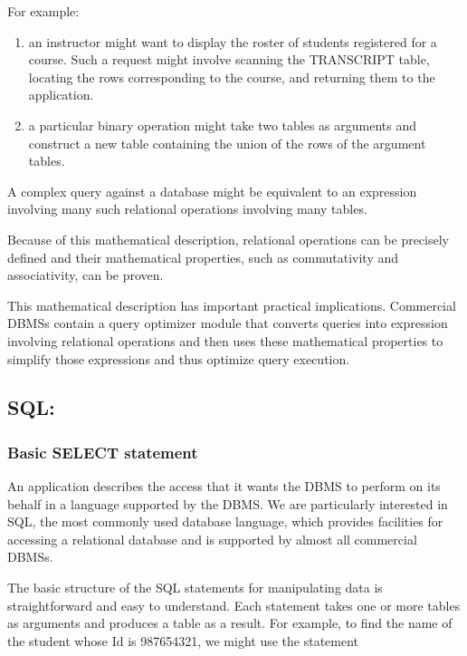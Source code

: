 \documentclass[]{article}
\providecommand{\tightlist}{%
  \setlength{\itemsep}{0pt}\setlength{\parskip}{0pt}}
\begin{document}
For example:

\begin{enumerate}
\def\labelenumi{\arabic{enumi}.}
\tightlist
\item
  an instructor might want to display the roster of students registered
  for a course. Such a request might involve scanning the TRANSCRIPT
  table, locating the rows corresponding to the course, and returning
  them to the application.\\
\item
  a particular binary operation might take two tables as arguments and
  construct a new table containing the union of the rows of the argument
  tables.
\end{enumerate}

A complex query against a database might be equivalent to an expression
involving many such relational operations involving many tables.

Because of this mathematical description, relational operations can be
precisely defined and their mathematical properties, such as
commutativity and associativity, can be proven.

This mathematical description has important practical implications.
Commercial DBMSs contain a query optimizer module that converts queries
into expression involving relational operations and then uses these
mathematical properties to simplify those expressions and thus optimize
query execution.

\hypertarget{sql}{%
\subsection{SQL:}\label{sql}}

\hypertarget{basic-select-statement}{%
\subsubsection{Basic SELECT statement}\label{basic-select-statement}}

An application describes the access that it wants the DBMS to perform on
its behalf in a language supported by the DBMS. We are particularly
interested in SQL, the most commonly used database language, which
provides facilities for accessing a relational database and is supported
by almost all commercial DBMSs.

The basic structure of the SQL statements for manipulating data is
straightforward and easy to understand. Each statement takes one or more
tables as arguments and produces a table as a result. For example, to
find the name of the student whose Id is 987654321, we might use the
statement
\end{document}
